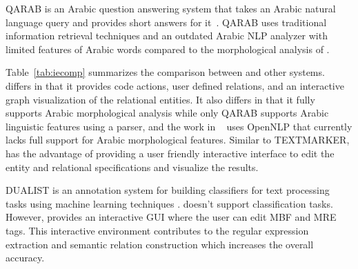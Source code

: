 QARAB is an Arabic question answering system that 
takes an Arabic natural language query and provides short answers for it~\cite{hammo2002qarab}. 
QARAB uses traditional information retrieval techniques and an outdated Arabic NLP 
analyzer with limited features of Arabic words compared 
to the morphological analysis of \framework. 

\begin{table}[tb]
\caption{\label{tab:iecomp}Comparison of \framework with SystemT, 
TEXTMARKER, 
Urbain, 
QARAB}
\end{table}

Table~\ref{tab:iecomp} summarizes the comparison between \framework and
other systems. \framework differs in that it provides 
code actions, user defined relations, and an interactive 
graph visualization of the relational entities. 
It also differs in that it fully supports Arabic morphological analysis
while only QARAB supports Arabic linguistic features using a parser, and 
the work in ~\cite{urbain2012user} uses OpenNLP that currently lacks full
support for Arabic morphological features. 
Similar to TEXTMARKER, \framework has the advantage of providing 
a user friendly interactive interface to edit the entity and relational 
specifications and visualize the results. 

DUALIST is an annotation system for building classifiers for 
text processing tasks using machine learning techniques 
\cite{settles2011closing}. 
\framework doesn't support classification tasks. 
However, \framework provides an interactive GUI where the user can edit MBF and MRE tags.
This interactive environment contributes to the regular expression extraction 
and semantic relation construction which increases the overall accuracy.

